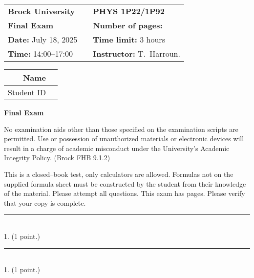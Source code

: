 \documentclass[12pt]{article}
\newcommand{\thinrule}{\noindent\rule{\linewidth}{0.5pt}}
\begin{document}
\thispagestyle{empty}
\begin{center}
\vspace{0.15in}
{\large
\begin{tabular}{lcl} 
{\bf Brock University} & \hspace*{0.3in} &  {\bf PHYS 1P22/1P92}  \\
{\bf Final Exam}       & & {\bf Number of pages:} \pageref{LastPage}  \\
{\bf Date:} July 18, 2025	& & {\bf Time limit:} 3 hours                  \\
{\bf Time:} 14:00--17:00     & & {\bf Instructor:} T.~Harroun.
\end{tabular}
}
\end{center}

\begin{center}

{\Large
\begin{tabular}{|r|c|}
\hline
Name	   & \hspace*{3.5in}	\\ \hline
Student ID &            	    \\ \hline
\end{tabular}
}
\end{center} 


\vspace{0cm}
\begin{center}
\textbf{Final Exam}
\end{center}

\vspace{1em}
%
No examination aids other than those specified on the examination scripts are permitted. Use or possession of unauthorized materials or electronic devices will result in a charge of academic misconduct under the University’s Academic Integrity Policy. (Brock FHB 9.1.2) 

This is a closed--book test, only calculators are allowed. Formulas not on the supplied formula sheet must be constructed by the student from their knowledge of the material. Please attempt all questions. This exam has \pageref{LastPage} pages. Please verify that your copy is complete.



\clearpage
\thinrule\\
1. (1 point.) 

\vspace{1em}
\thinrule\\
1. (1 point.) 
\end{document}
